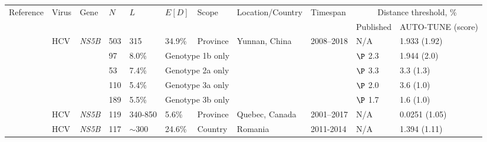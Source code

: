 \documentclass[utf8]{FrontiersinHarvard} %
\begin{document}
\begin{table}[h]
	\vspace{10pt}
	\centering
	\begin{ssmall}
		\label{tab:paperComparison}
		\begin{tabular}{lllllllllll}
			\hline
			Reference               & Virus      & Gene          & $N$                & $L$        & $E[D]$                               & Scope    & Location/Country       & Timespan  & \multicolumn{2}{c}{Distance threshold, \%}                     \\
			                        &            &               &                    &            &                                      &          &                        &           & Published                                  & AUTO-TUNE (score) \\
			\hline
			\cite{Jia:2023aa}       & HCV        & {\it NS5B}    & 503                & 315        & 34.9\%                               & Province & Yunnan, China          & 2008–2018 & N/A                                        & 1.933 (1.92)      \\
			                        &            &               & 97                 & 8.0\%      & \multicolumn{4}{l}{Genotype 1b only} & $\P$ 2.3 & 1.944 (2.0)                                                                                         \\
			                        &            &               & 53                 & 7.4\%      & \multicolumn{4}{l}{Genotype 2a only} & $\P$ 3.3 & 3.3 (1.3)                                                                                           \\
			                        &            &               & 110                & 5.4\%      & \multicolumn{4}{l}{Genotype 3a only} & $\P$ 2.0 & 3.6 (1.0)                                                                                           \\
			                        &            &               & 189                & 5.5\%      & \multicolumn{4}{l}{Genotype 3b only} & $\P$ 1.7 & 1.6 (1.0)                                                                                           \\
			\cite{Murphy:2019aa}    & HCV        & {\it NS5B}    & 119                & 340-850    & 5.6\%                                & Province & Quebec, Canada         & 2001–2017 & N/A                                        & 0.0251 (1.05)     \\
			\cite{Paraschiv:2017aa} & HCV        & {\it NS5B}    & 117                & $\sim 300$ & 24.6\%                               & Country  & Romania                & 2011-2014 & N/A                                        & 1.394 (1.11)      \\

\end{tabular}
\end{ssmall}
\end{table}
\end{document}
